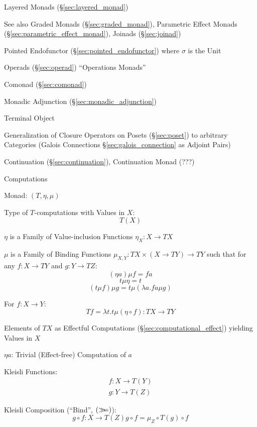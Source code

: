 Layered Monads (\S\ref{sec:layered_monad}) \cite{filinski99}

\fist See also Graded Monads (\S\ref{sec:graded_monad}), Parametric
Effect Monads (\S\ref{sec:parametric_effect_monad}), Joinads
(\S\ref{sec:joinad})

Pointed Endofunctor (\S\ref{sec:pointed_endofunctor}) where $\sigma$
is the Unit

Operads (\S\ref{sec:operad}) ``Operations Monads''


\asterism


Comonad (\S\ref{sec:comonad})

Monadic Adjunction (\S\ref{sec:monadic_adjunction})

Terminal Object %

Generalization of Closure Operators on Posets (\S\ref{sec:poset}) to
arbitrary Categories (Galois Connections \S\ref{sec:galois_connection}
as Adjoint Pairs)

Continuation (\S\ref{sec:continuation}), Continuation Monad (???) %


\asterism


Computations

Monad: $(T,\eta,\mu)$

Type of $T$-computations with Values in $X$:
\[
  T (X)
\]

$\eta$ is a Family of Value-inclusion Functions $\eta_X : X
\rightarrow T X$

$\mu$ is a Family of Binding Functions $\mu_{X,Y} : T X \times (X
\rightarrow T Y) \rightarrow T Y$ such that for any $f : X \rightarrow
T Y$ and $g : Y \rightarrow T Z$:
\[
 (\eta a) \mu f = f a
\]\[
  t \mu \eta = t
\]\[
  (t \mu f) \mu g = t \mu (\lambda a.f a \mu g)
\]

For $f : X \rightarrow Y$:
\[
  T f = \lambda t.t \mu (\eta \circ f) : T X \rightarrow T Y
\]

Elements of $T X$ as Effectful Computations
(\S\ref{sec:computational_effect}) yielding Values in $X$

$\eta a$: Trivial (Effect-free) Computation of $a$


Kleisli Functions:
\[
\begin{split}
  f : X \rightarrow T(Y) \\
  g : Y \rightarrow T(Z)
\end{split}
\]

Kleisli Composition (``Bind'', $\mathtt{(\mathsf{\gg\kern-3pt=})}$):
\[
  g \circ f : X \rightarrow T(Z)
  g \circ f = \mu_Z \circ T(g) \circ f
\]

